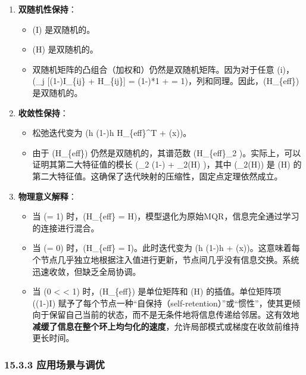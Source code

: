 \documentclass[
  12pt,
]{article}
\providecommand{\tightlist}{%
  \setlength{\itemsep}{0pt}\setlength{\parskip}{0pt}}
\begin{document}
\begin{enumerate}
\def\labelenumi{\arabic{enumi}.}
\tightlist
\item
  \textbf{双随机性保持}：

  \begin{itemize}
  \tightlist
  \item
    (I) 是双随机的。
  \item
    (H) 是双随机的。
  \item
    双随机矩阵的凸组合（加权和）仍然是双随机矩阵。因为对于任意
    (i)，(\sum\_j {[}(1-\beta)I\_\{ij\} + \beta H\_\{ij\}{]} =
    (1-\beta)*1 +  = 1)，列和同理。因此，(H\_\{eff\})
    是双随机的。
  \end{itemize}
\item
  \textbf{收敛性保持}：

  \begin{itemize}
  \tightlist
  \item
    松弛迭代变为 (h \leftarrow (1-\alpha)h H\_\{eff\}\^{}T +
    \alphaJ(x))。
  \item
    由于 (H\_\{eff\}) 仍然是双随机的，其谱范数
    (\textbar H\_\{eff\}\textbar\_2
    )。实际上，可以证明其第二大特征值的模长
    (\textbar{}\lambda\_2\textbar{} \leq (1-\beta) +
    \beta\textbar{}\lambda\_2(H)\textbar{} )，其中 (\lambda\_2(H)) 是
    (H) 的第二大特征值。这确保了迭代映射的压缩性，固定点定理依然成立。
  \end{itemize}
\item
  \textbf{物理意义解释}：

  \begin{itemize}
  \tightlist
  \item
    当 (\beta = 1) 时，(H\_\{eff\} =
    H)，模型退化为原始MQR，信息完全通过学习的连接进行混合。
  \item
    当 (\beta = 0) 时，(H\_\{eff\} = I)。此时迭代变为 (h
    \leftarrow (1-\alpha)h +
    \alphaJ(x))。这意味着每个节点几乎独立地根据注入值进行更新，节点间几乎没有信息交换。系统迅速收敛，但缺乏全局协调。
  \item
    当 (0 \textless{} \beta \textless{} 1) 时，(H\_\{eff\}) 是单位矩阵和
    (H) 的插值。单位矩阵项 ((1-\beta)I)
    赋予了每个节点一种``自保持（self-retention）''或``惯性''，使其更倾向于保留自己当前的状态，而不是无条件地将信息传递给邻居。这有效地\textbf{减缓了信息在整个环上均匀化的速度}，允许局部模式或梯度在收敛前维持更长时间。
  \end{itemize}
\end{enumerate}

\hypertarget{ux5e94ux7528ux573aux666fux4e0eux8c03ux4f18}{%
\subsubsection{15.3.3
应用场景与调优}\label{ux5e94ux7528ux573aux666fux4e0eux8c03ux4f18}}
\end{document}
